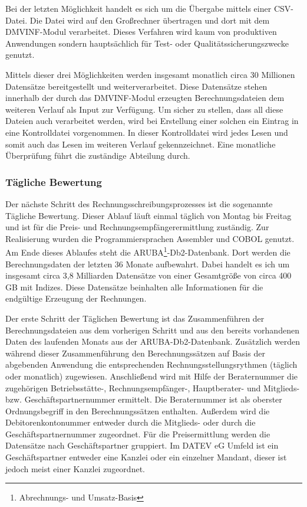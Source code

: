 Bei der letzten Möglichkeit handelt es sich um die Übergabe mittels einer CSV-Datei.
Die Datei wird auf den Großrechner übertragen und dort mit dem DMVINF-Modul verarbeitet.
Dieses Verfahren wird kaum von produktiven Anwendungen sondern hauptsächlich für Test- oder Qualitätssicherungszwecke genutzt.

Mittels dieser drei Möglichkeiten werden insgesamt monatlich circa 30 Millionen Datensätze bereitgestellt und weiterverarbeitet.
Diese Datensätze stehen innerhalb der durch das DMVINF-Modul erzeugten Berechnungsdateien dem weiteren Verlauf als Input zur Verfügung.
Um sicher zu stellen, dass all diese Dateien auch verarbeitet werden, wird bei Erstellung einer solchen ein Eintrag in eine Kontrolldatei vorgenommen.
In dieser Kontrolldatei wird jedes Lesen und somit auch das Lesen im weiteren Verlauf gekennzeichnet.
Eine monatliche Überprüfung führt die zuständige Abteilung durch.

\subsubsection{Tägliche Bewertung}\label{sssec:täglbew}
Der nächste Schritt des Rechnungsschreibungsprozesses ist die sogenannte Tägliche Bewertung.
Dieser Ablauf läuft einmal täglich von Montag bis Freitag und ist für die Preis- und Rechnungsempfängerermittlung zuständig.
Zur Realisierung wurden die Programmiersprachen Assembler und COBOL genutzt.
Am Ende dieses Ablaufes steht die ARUBA\footnote{Abrechnungs- und Umsatz-Basis}-Db2-Datenbank.
Dort werden die Berechnungsdaten der letzten 36 Monate aufbewahrt.
Dabei handelt es ich um insgesamt circa 3,8 Milliarden Datensätze von einer Gesamtgröße von circa 400 GB mit Indizes.
Diese Datensätze beinhalten alle Informationen für die endgültige Erzeugung der Rechnungen.

Der erste Schritt der Täglichen Bewertung ist das Zusammenführen der Berechnungsdateien aus dem vorherigen Schritt und aus den bereits vorhandenen Daten des laufenden Monats aus der ARUBA-Db2-Datenbank.
Zusätzlich werden während dieser Zusammenführung den Berechnungssätzen auf Basis der abgebenden Anwendung die entsprechenden Rechnungsstellungsrythmen (täglich oder monatlich) zugewiesen.
Anschließend wird mit Hilfe der Beraternummer die zugehörigen Betriebsstätte-, Rechnungsempfänger-, Hauptberater- und Mitglieds- bzw. Geschäftspartnernummer ermittelt.
Die Beraternummer ist als oberster Ordnungsbegriff in den Berechnungssätzen enthalten.
Außerdem wird die Debitorenkontonummer entweder durch die Mitglieds- oder durch die Geschäftspartnernummer zugeordnet.
Für die Preisermittlung werden die Datensätze nach Geschäftspartner gruppiert.
Im DATEV eG Umfeld ist ein Geschäftspartner entweder eine Kanzlei oder ein einzelner Mandant, dieser ist jedoch meist einer Kanzlei zugeordnet.

